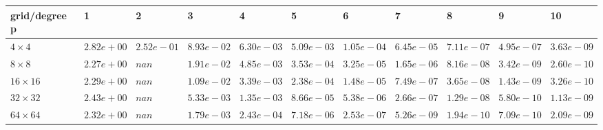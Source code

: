 \begin{tabular}{lllllllllll}
\hline
 grid/degree p   & 1          & 2          & 3          & 4          & 5          & 6          & 7          & 8          & 9          & 10         \\
\hline
 $4 \times 4$    & $2.82e+00$ & $2.52e-01$ & $8.93e-02$ & $6.30e-03$ & $5.09e-03$ & $1.05e-04$ & $6.45e-05$ & $7.11e-07$ & $4.95e-07$ & $3.63e-09$ \\
 $8 \times 8$    & $2.27e+00$ & $nan$      & $1.91e-02$ & $4.85e-03$ & $3.53e-04$ & $3.25e-05$ & $1.65e-06$ & $8.16e-08$ & $3.42e-09$ & $2.60e-10$ \\
 $16 \times 16$  & $2.29e+00$ & $nan$      & $1.09e-02$ & $3.39e-03$ & $2.38e-04$ & $1.48e-05$ & $7.49e-07$ & $3.65e-08$ & $1.43e-09$ & $3.26e-10$ \\
 $32 \times 32$  & $2.43e+00$ & $nan$      & $5.33e-03$ & $1.35e-03$ & $8.66e-05$ & $5.38e-06$ & $2.66e-07$ & $1.29e-08$ & $5.80e-10$ & $1.13e-09$ \\
 $64 \times 64$  & $2.32e+00$ & $nan$      & $1.79e-03$ & $2.43e-04$ & $7.18e-06$ & $2.53e-07$ & $5.26e-09$ & $1.94e-10$ & $7.09e-10$ & $2.09e-09$ \\
\hline
\end{tabular}